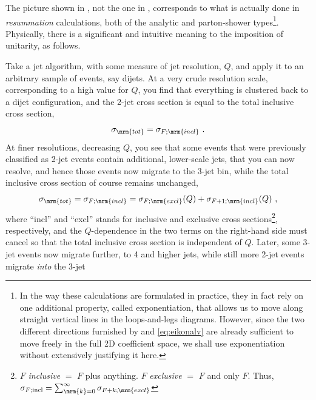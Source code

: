 The picture shown in , not the one in , 
corresponds to what is actually done in
\emph{resummation} calculations, both of the analytic and
parton-shower types\footnote{In the way these calculations are 
formulated in practice, they
in fact rely on one additional property, called exponentiation, that allows us
to move along straight vertical lines in the loops-and-legs diagrams. However, 
since the two different directions furnished by  and
\eqref{eq:eikonalv} are already sufficient to move freely in the
full 2D coefficient space, we shall use exponentiation
without extensively justifying it here.}.
Physically, there is a significant and intuitive meaning to the imposition of
unitarity, as follows. 

Take a jet algorithm, with some measure of jet resolution, $Q$, and
apply it to an arbitrary sample of events, say dijets. At a very crude
resolution scale, corresponding to a high value for $Q$, 
you find that everything is clustered back to a dijet configuration,
and the 2-jet cross section is equal to the total inclusive cross
section,
\begin{equation}
\sigma_\mrm{tot} = \sigma_{F;\mrm{incl}} ~.
\end{equation}
At finer resolutions, decreasing $Q$, you see that 
some events that were previously classified as 2-jet events contain
additional, lower-scale jets, that you can now resolve, and hence
those events now migrate to the 3-jet bin, while the total inclusive
cross section of course remains unchanged,
\begin{equation}
\sigma_\mrm{tot} = \sigma_{F;\mrm{incl}} = \sigma_{F;\mrm{excl}}(Q)
+ \sigma_{F+1;\mrm{incl}}(Q)~, \label{eq:incexc}
\end{equation}
where ``incl'' and ``excl'' stands for inclusive and exclusive cross
sections\footnote{$F$ \emph{inclusive} $=$ $F$ plus
  anything. $F$ \emph{exclusive} $=$ $F$ and only
  $F$. Thus, $\sigma_{F;\mathrm{incl}}=\sum_{\mrm{k}=
    0}^{\infty}\sigma_{F+k;\mrm{excl}}$},  
respectively, 
and the $Q$-dependence in the two terms on the 
right-hand side must cancel so that the total inclusive cross
section is independent of $Q$. Later, some 3-jet events now migrate 
further, to 4 and higher jets, 
while still more 2-jet events migrate \emph{into} the 3-jet
